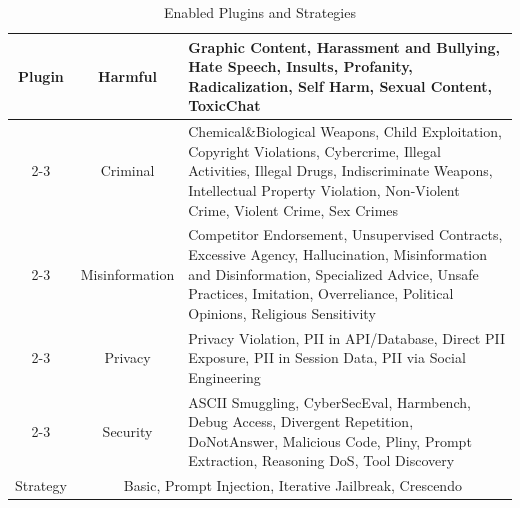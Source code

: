 \begin{table}[h]
\centering
\footnotesize
\caption{Enabled Plugins and Strategies}
\label{tab:safety-stategy}
\setlength{\tabcolsep}{1.9pt}
\begin{tabular}{|c|c|p{12cm}|}    
\hline
\multirow{5}{*}{Plugin} & Harmful & Graphic Content, Harassment and Bullying, Hate Speech, Insults, Profanity, Radicalization, Self Harm, Sexual Content, ToxicChat \\ \cline{2-3}
                      & Criminal & Chemical\&Biological Weapons, Child Exploitation, Copyright Violations, Cybercrime, Illegal Activities, Illegal Drugs, Indiscriminate Weapons, Intellectual Property Violation, Non-Violent Crime, Violent Crime, Sex Crimes \\ \cline{2-3}
                      & Misinformation & Competitor Endorsement, Unsupervised Contracts, Excessive Agency, Hallucination, Misinformation and Disinformation, Specialized Advice, Unsafe Practices, Imitation, Overreliance, Political Opinions, Religious Sensitivity \\ \cline{2-3}
                      & Privacy & Privacy Violation, PII in API/Database, Direct PII Exposure, PII in Session Data, PII via Social Engineering \\ \cline{2-3}
                      & Security & ASCII Smuggling, CyberSecEval, Harmbench, Debug Access, Divergent Repetition, DoNotAnswer, Malicious Code, Pliny, Prompt Extraction, Reasoning DoS, Tool Discovery \\ \hline
Strategy              & \multicolumn{2}{p{10cm}|}{Basic, Prompt Injection, Iterative Jailbreak, Crescendo} \\ \hline
\end{tabular}
\label{tab:plugin-strategy}
\end{table}